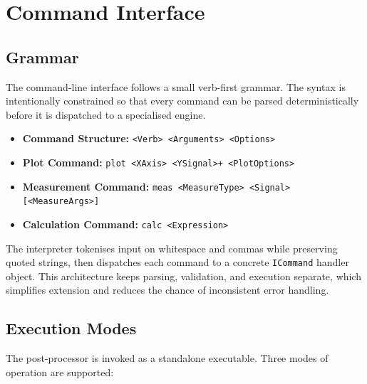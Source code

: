 \section{Command Interface}
\label{sec:command-interface}

\subsection{Grammar}
\label{subsec:command-grammar}

The command-line interface follows a small verb-first grammar. The syntax is intentionally constrained so that every command can be parsed deterministically before it is dispatched to a specialised engine.

\begin{itemize}
  \item \textbf{Command Structure:} \texttt{<Verb> <Arguments> <Options>}
  \item \textbf{Plot Command:} \texttt{plot <XAxis> <YSignal>+ <PlotOptions>}
  \item \textbf{Measurement Command:} \texttt{meas <MeasureType> <Signal> [<MeasureArgs>]}
  \item \textbf{Calculation Command:} \texttt{calc <Expression>}
\end{itemize}

The interpreter tokenises input on whitespace and commas while preserving quoted strings, then dispatches each command to a concrete \texttt{ICommand} handler object. This architecture keeps parsing, validation, and execution separate, which simplifies extension and reduces the chance of inconsistent error handling.

\subsection{Execution Modes}
\label{sec:pp-invocation}

The post-processor is invoked as a standalone executable.  Three modes of operation are supported:

